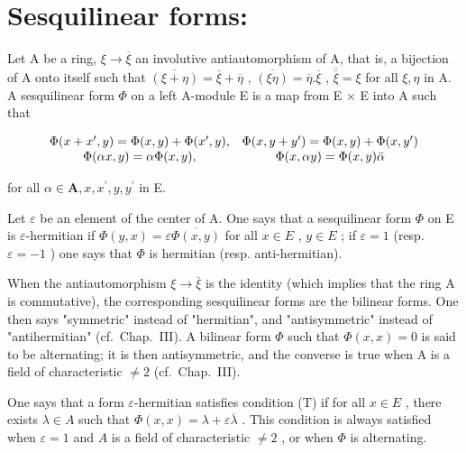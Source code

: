 \section*{Sesquilinear forms:}

Let A be a ring, \(\xi \to \overline{\xi}\) an involutive antiautomorphism of A, that is, a bijection of A onto itself such that \(\overline{(\xi + \eta)} = \overline{\xi} + \overline{\eta}\) , \(\overline{(\xi\eta)} = \overline{\eta} . \overline{\xi}\) , \(\overline{\overline{\xi}} = \xi\) for all \(\xi, \eta\) in A. A sesquilinear form \(\Phi\) on a left A-module E is a map from E × E into A such that

\[
\begin{array}{c c} \Phi (x + x ^ {\prime}, y) = \Phi (x, y) + \Phi (x ^ {\prime}, y), & \Phi (x, y + y ^ {\prime}) = \Phi (x, y) + \Phi (x, y ^ {\prime}) \\ \Phi (\alpha x, y) = \alpha \Phi (x, y), & \Phi (x, \alpha y) = \Phi (x, y) \bar {\alpha} \end{array}
\]

for all \(\alpha\in\mathbf{A},x,x^{\prime},y,y^{\prime}\) in E.

Let \(\varepsilon\) be an element of the center of A. One says that a sesquilinear form \(\Phi\) on E is \(\varepsilon\)-hermitian if \(\Phi(y, x) = \varepsilon \overline{\Phi(x, y)}\) for all \(x \in E\) , \(y \in E\) ; if \(\varepsilon = 1\) (resp. \(\varepsilon = -1\) ) one says that \(\Phi\) is hermitian (resp. anti-hermitian).

When the antiautomorphism \(\xi\to\overline{\xi}\) is the identity (which implies that the ring A is commutative), the corresponding sesquilinear forms are the bilinear forms. One then says "symmetric" instead of "hermitian", and "antisymmetric" instead of "antihermitian" (cf.~Chap.~III). A bilinear form \(\Phi\) such that \(\Phi(x,x)=0\) is said to be alternating; it is then antisymmetric, and the converse is true when A is a field of characteristic \(\neq2\) (cf.~Chap.~III).

One says that a form \(\varepsilon\)-hermitian satisfies condition (T) if for all \(x \in E\) , there exists \(\lambda \in A\) such that \(\Phi(x, x) = \lambda + \varepsilon \overline{\lambda}\) . This condition is always satisfied when \(\varepsilon = 1\) and \(A\) is a field of characteristic \(\neq 2\) , or when \(\Phi\) is alternating.

